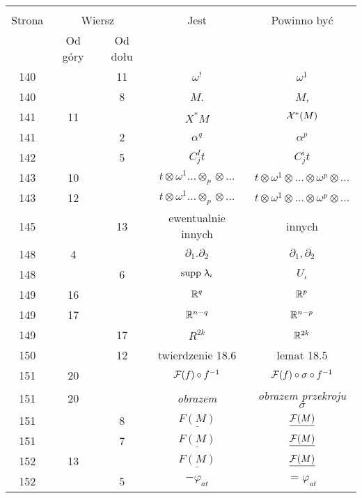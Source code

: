 \documentclass[a4paper,11pt]{article}
\begin{document}
\begin{center}
  \begin{tabular}{|c|c|c|c|c|}
    \hline
    & \multicolumn{2}{c|}{} & & \\
    Strona & \multicolumn{2}{c|}{Wiersz} & Jest
                              & Powinno być \\ \cline{2-3}
    & Od góry & Od dołu & & \\
    \hline
    140 & & 11 & $\omega^{ ! }$ & $\omega^{ 1 }$ \\
    140 & &  8 & $M$. & $M$, \\
    141 & 11 & & $X^{ * } M$ & $\mathcal{X}^{ * }( M )$ \\
    141 & &  2 & $\alpha^{ q }$ & $\alpha^{ p }$ \\
    142 & &  5 & $C^{ I }_{ j } t$ & $C^{ i }_{ j } t$ \\
    143 & 10 & & $t \otimes \omega^{ 1 } \ldots \otimes_{ p } \otimes \ldots$
           & $t \otimes \omega^{ 1 } \otimes \ldots \otimes \omega^{ p } \otimes \ldots$ \\
    143 & 12 & & $t \otimes \omega^{ 1 } \ldots \otimes_{ p } \otimes \ldots$
           & $t \otimes \omega^{ 1 } \otimes \ldots \otimes \omega^{ p } \otimes \ldots$ \\
    145 & & 13 & ewentualnie innych & innych \\
    148 &  4 & & $\partial_{ 1 }.\partial_{ 2 }$ & $\partial_{ 1 }, \partial_{ 2 }$ \\
    148 & &  6 & $\mathrm{supp}\,\, \uplambda_{ \iota }$ & $U_{ \iota }$ \\
    149 & 16 & & $\mathbb{R}^{ q }$ & $\mathbb{R}^{ p }$ \\
    149 & 17 & & $\mathbb{R}^{ n - q }$ & $\mathbb{R}^{ n - p }$ \\
    149 & & 17 & $R^{ 2k }$ & $\mathbb{R}^{ 2k }$ \\
    150 & & 12 & twierdzenie 18.6 & lemat 18.5 \\
    151 & 20 & & $\mathcal{F}( f ) \circ f^{ -1 }$
           & $\mathcal{F}( f ) \circ \sigma \circ f^{ -1 }$ \\
    151 & 20 & & \textit{obrazem} & \textit{obrazem przekroju} $\sigma$ \\
    151 & &  8 & $\underline{ F( M ) }$
           & $\underline{ \mathcal{F}( M ) }$ \\
    151 & &  7 & $\underline{ F( M ) }$ & $\underline{ \mathcal{F}( M ) }$ \\
    152 & 13 & & $\underline{ F( M ) }$ & $\underline{ \mathcal{F}( M ) }$ \\
    152 & &  5 & $-\varphi_{ a t }$ & $= \varphi_{ a t }$ \\

\end{tabular}
\end{center}
\end{document}
